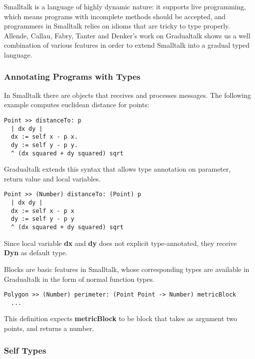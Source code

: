 
Smalltalk is a language of highly dynamic nature:
it supports live programming, which means programs with incomplete
methods should be accepted, and programmers in Smalltalk relies on
idioms that are tricky to type properly.
Allende, Callau, Fabry, Tanter and Denker's work on Gradualtalk\cite{allende2014gradual} shows
us a well combination of various features in order to extend Smalltalk
into a gradual typed language.

\subsubsection{Annotating Programs with Types}

In Smalltalk there are objects that receives and processes messages.
The following example computes euclidean distance for points:

\begin{verbatim}
Point >> distanceTo: p
  | dx dy |
  dx := self x - p x.
  dy := self y - p y.
  ^ (dx squared + dy squared) sqrt
\end{verbatim}

Gradualtalk extends this syntax that allows
type annotation on parameter, return value and local variables.

\begin{verbatim}
Point >> (Number) distanceTo: (Point) p
  | dx dy |
  dx := self x - p x
  dy := self y - p y
  ^ (dx squared + dy squared) sqrt
\end{verbatim}

Since local variable \textbf{dx} and \textbf{dy} does not explicit type-annotated,
they receive \textbf{Dyn} as default type.

Blocks are basic features in Smalltalk,
whose corresponding types are available in Gradualtalk in the form of normal function types.

\begin{verbatim}
Polygon >> (Number) perimeter: (Point Point -> Number) metricBlock
  ...
\end{verbatim}

This definition expects \textbf{metricBlock} to be block
that takes as argument two points, and returns a number.

\subsubsection{Self Types}

